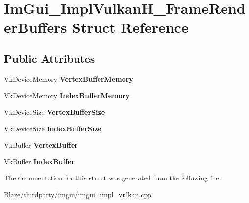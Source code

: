 \hypertarget{structImGui__ImplVulkanH__FrameRenderBuffers}{}\section{Im\+Gui\+\_\+\+Impl\+Vulkan\+H\+\_\+\+Frame\+Render\+Buffers Struct Reference}
\label{structImGui__ImplVulkanH__FrameRenderBuffers}
\subsection*{Public Attributes}
\begin{DoxyCompactItemize}
\item 
\mbox{\label{structImGui__ImplVulkanH__FrameRenderBuffers_a141885e5f237387bb2ce1989aa73a76a}} 
Vk\+Device\+Memory {\bfseries Vertex\+Buffer\+Memory}
\item 
\mbox{\label{structImGui__ImplVulkanH__FrameRenderBuffers_a28120d78a13ad648095bd3ac2d7dc16d}} 
Vk\+Device\+Memory {\bfseries Index\+Buffer\+Memory}
\item 
\mbox{\label{structImGui__ImplVulkanH__FrameRenderBuffers_a4399b386e06992f5d340b558ed037539}} 
Vk\+Device\+Size {\bfseries Vertex\+Buffer\+Size}
\item 
\mbox{\label{structImGui__ImplVulkanH__FrameRenderBuffers_af68f8fe2cc91da040cff310249fed575}} 
Vk\+Device\+Size {\bfseries Index\+Buffer\+Size}
\item 
\mbox{\label{structImGui__ImplVulkanH__FrameRenderBuffers_a868d4dc03c831c458a21ecc593e296d1}} 
Vk\+Buffer {\bfseries Vertex\+Buffer}
\item 
\mbox{\label{structImGui__ImplVulkanH__FrameRenderBuffers_a2a7386292214c2b71aeffa1e257f0b21}} 
Vk\+Buffer {\bfseries Index\+Buffer}
\end{DoxyCompactItemize}


The documentation for this struct was generated from the following file\+:\begin{DoxyCompactItemize}
\item 
Blaze/thirdparty/imgui/imgui\+\_\+impl\+\_\+vulkan.\+cpp\end{DoxyCompactItemize}
